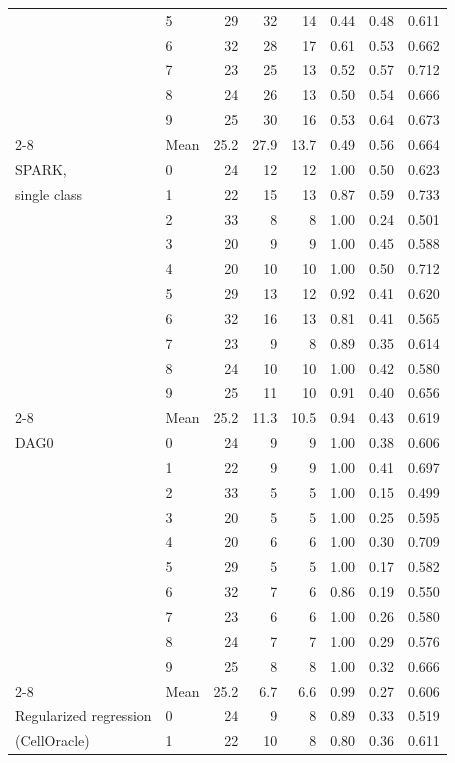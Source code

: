 \begin{tabular}{llrrrccc}
 & 5 & 29 & 32 & 14 & 0.44 & 0.48 & 0.611 \\
 & 6 & 32 & 28 & 17 & 0.61 & 0.53 & 0.662 \\
 & 7 & 23 & 25 & 13 & 0.52 & 0.57 & 0.712 \\
 & 8 & 24 & 26 & 13 & 0.50 & 0.54 & 0.666 \\
 & 9 & 25 & 30 & 16 & 0.53 & 0.64 & 0.673 \\
\cmidrule{2-8}
 & Mean & 25.2 & 27.9 & 13.7 & 0.49 & 0.56 & 0.664 \\
\midrule
SPARK, & 0 & 24 & 12 & 12 & 1.00 & 0.50 & 0.623 \\
single class & 1 & 22 & 15 & 13 & 0.87 & 0.59 & 0.733 \\
 & 2 & 33 & 8 & 8 & 1.00 & 0.24 & 0.501 \\
 & 3 & 20 & 9 & 9 & 1.00 & 0.45 & 0.588 \\
 & 4 & 20 & 10 & 10 & 1.00 & 0.50 & 0.712 \\
 & 5 & 29 & 13 & 12 & 0.92 & 0.41 & 0.620 \\
 & 6 & 32 & 16 & 13 & 0.81 & 0.41 & 0.565 \\
 & 7 & 23 & 9 & 8 & 0.89 & 0.35 & 0.614 \\
 & 8 & 24 & 10 & 10 & 1.00 & 0.42 & 0.580 \\
 & 9 & 25 & 11 & 10 & 0.91 & 0.40 & 0.656 \\
\cmidrule{2-8}
 & Mean & 25.2 & 11.3 & 10.5 & 0.94 & 0.43 & 0.619 \\
\midrule
DAG0 & 0 & 24 & 9 & 9 & 1.00 & 0.38 & 0.606 \\
 & 1 & 22 & 9 & 9 & 1.00 & 0.41 & 0.697 \\
 & 2 & 33 & 5 & 5 & 1.00 & 0.15 & 0.499 \\
 & 3 & 20 & 5 & 5 & 1.00 & 0.25 & 0.595 \\
 & 4 & 20 & 6 & 6 & 1.00 & 0.30 & 0.709 \\
 & 5 & 29 & 5 & 5 & 1.00 & 0.17 & 0.582 \\
 & 6 & 32 & 7 & 6 & 0.86 & 0.19 & 0.550 \\
 & 7 & 23 & 6 & 6 & 1.00 & 0.26 & 0.580 \\
 & 8 & 24 & 7 & 7 & 1.00 & 0.29 & 0.576 \\
 & 9 & 25 & 8 & 8 & 1.00 & 0.32 & 0.666 \\
\cmidrule{2-8}
 & Mean & 25.2 & 6.7 & 6.6 & 0.99 & 0.27 & 0.606 \\
\midrule
Regularized regression & 0 & 24 & 9 & 8 & 0.89 & 0.33 & 0.519 \\
(CellOracle) & 1 & 22 & 10 & 8 & 0.80 & 0.36 & 0.611 \\

\end{tabular}
